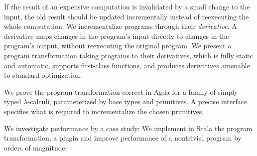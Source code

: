 If the result of an expensive computation is invalidated by a small
change to the input, the old result
should be updated incrementally instead of reexecuting the whole computation.
We incrementalize programs through
their \emph{derivative}. A derivative maps
changes in the program's input directly to changes in the program's
output, without reexecuting the original program. We present a
program transformation taking programs to their
derivatives, which is fully static and automatic, supports first-class
functions, and produces derivatives amenable to standard
optimization.

We prove the program transformation correct in Agda for a
family of simply-typed $\lambda$-calculi, parameterized by base
types and primitives. A precise interface specifies what is
required to incrementalize the chosen primitives.

We investigate performance by a case study: We implement in Scala the
program transformation, a plugin and improve performance of a nontrivial program by
orders of magnitude.

